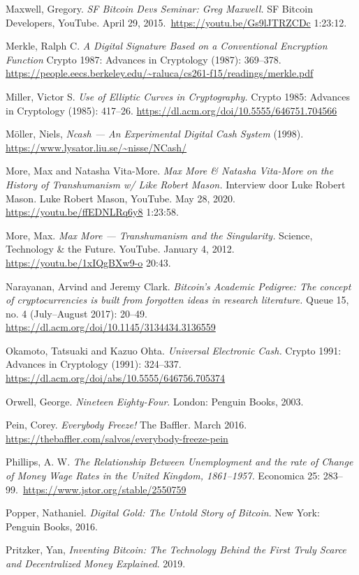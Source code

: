 \documentclass[
  a5paper,
  smalldemyvopaper,11pt,twoside,onecolumn,openright,extrafontsizes,
hidelinks]{memoir}
\begin{document}
Maxwell, Gregory. \emph{SF Bitcoin Devs Seminar: Greg Maxwell.} SF
Bitcoin Developers, YouTube. April 29,
2015.~\url{https://youtu.be/Gs9lJTRZCDc} 1:23:12.

Merkle, Ralph C. \emph{A Digital Signature Based on a Conventional
Encryption Function} Crypto 1987: Advances in Cryptology (1987):
369--378.
\url{https://people.eecs.berkeley.edu/~raluca/cs261-f15/readings/merkle.pdf}

Miller, Victor S. \emph{Use of Elliptic Curves in Cryptography.} Crypto
1985: Advances in Cryptology (1985): 417--26.
\url{https://dl.acm.org/doi/10.5555/646751.704566}

Möller, Niels, \emph{Ncash --- An Experimental Digital Cash System}
(1998). \url{https://www.lysator.liu.se/~nisse/NCash/}

More, Max and Natasha Vita-More. \emph{Max More \& Natasha Vita-More on
the History of Transhumanism w/ Like Robert Mason.} Interview door Luke
Robert Mason. Luke Robert Mason, YouTube. May 28, 2020.
\url{https://youtu.be/ffEDNLRq6y8} 1:23:58.

More, Max. \emph{Max More --- Transhumanism and the Singularity.}
Science, Technology \& the Future. YouTube. January 4, 2012.
\url{https://youtu.be/1xIQgBXw9-o} 20:43.

Narayanan, Arvind and Jeremy Clark. \emph{Bitcoin's Academic Pedigree:
The concept of cryptocurrencies is built from forgotten ideas in
research literature.} Queue 15, no. 4 (July--August 2017): 20--49.
\url{https://dl.acm.org/doi/10.1145/3134434.3136559}

Okamoto, Tatsuaki and Kazuo Ohta. \emph{Universal Electronic Cash.}
Crypto 1991: Advances in Cryptology (1991): 324--337.
\url{https://dl.acm.org/doi/abs/10.5555/646756.705374}

Orwell, George. \emph{Nineteen Eighty-Four}. London: Penguin Books,
2003.

Pein, Corey. \emph{Everybody Freeze!} The Baffler. March 2016.
\url{https://thebaffler.com/salvos/everybody-freeze-pein}

Phillips, A. W. \emph{The Relationship Between Unemployment and the rate
of Change of Money Wage Rates in the United Kingdom, 1861--1957.}
Economica 25: 283--99.~\url{https://www.jstor.org/stable/2550759}

Popper, Nathaniel. \emph{Digital Gold: The Untold Story of Bitcoin}. New
York: Penguin Books, 2016.

Pritzker, Yan, \emph{Inventing Bitcoin: The Technology Behind the First
Truly Scarce and Decentralized Money Explained}. 2019.
\end{document}
